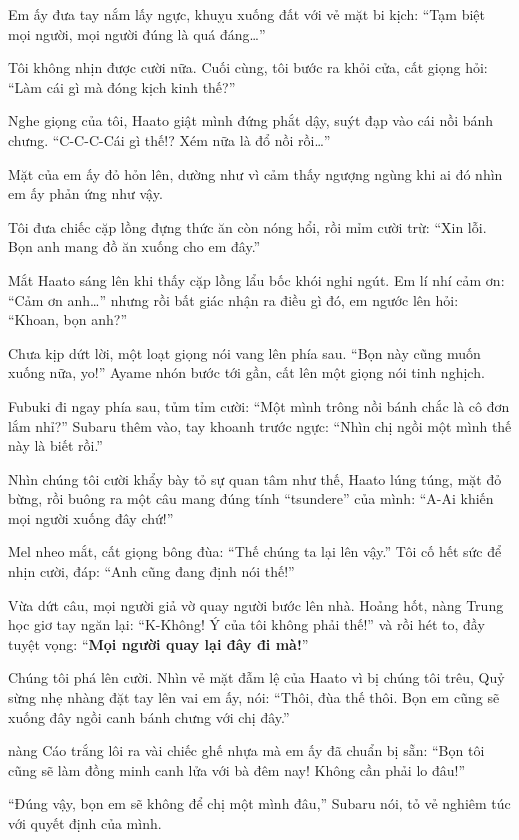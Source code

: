 \documentclass[../main.tex]{subfiles}
\begin{document}
Em ấy đưa tay nắm lấy ngực, khuỵu xuống đất với vẻ mặt bi kịch: ``Tạm biệt mọi người, mọi người đúng là quá đáng\dots''

Tôi không nhịn được cười nữa. Cuối cùng, tôi bước ra khỏi cửa, cất giọng hỏi: ``Làm cái gì mà đóng kịch kinh thế?''

Nghe giọng của tôi, Haato giật mình đứng phắt dậy, suýt đạp vào cái nồi bánh chưng. ``C-C-C-Cái gì thế!? Xém nữa là đổ nồi rồi\dots''

Mặt của em ấy đỏ hỏn lên, dường như vì cảm thấy ngượng ngùng khi ai đó nhìn em ấy phản ứng như vậy.

Tôi đưa chiếc cặp lồng đựng thức ăn còn nóng hổi, rồi mỉm cười trừ: ``Xin lỗi. Bọn anh mang đồ ăn xuống cho em đây.''

Mắt Haato sáng lên khi thấy cặp lồng lẩu bốc khói nghi ngút. Em lí nhí cảm ơn: ``Cảm ơn anh\dots'' nhưng rồi bất giác nhận ra điều gì đó, em ngước lên hỏi: ``Khoan, bọn anh?''

Chưa kịp dứt lời, một loạt giọng nói vang lên phía sau. ``Bọn này cũng muốn xuống nữa, yo!'' Ayame nhón bước tới gần, cất lên một giọng nói tinh nghịch.

Fubuki đi ngay phía sau, tủm tỉm cười: ``Một mình trông nồi bánh chắc là cô đơn lắm nhỉ?'' Subaru thêm vào, tay khoanh trước ngực: ``Nhìn chị ngồi một mình thế này là biết rồi.''

Nhìn chúng tôi cười khẩy bày tỏ sự quan tâm như thế, Haato lúng túng, mặt đỏ bừng, rồi buông ra một câu mang đúng tính ``tsundere'' của mình: ``A-Ai khiến mọi người xuống đây chứ!''

Mel nheo mắt, cất giọng bông đùa: ``Thế chúng ta lại lên vậy.'' Tôi cố hết sức để nhịn cười, đáp: ``Anh cũng đang định nói thế!''

Vừa dứt câu, mọi người giả vờ quay người bước lên nhà. Hoảng hốt, nàng Trung học giơ tay ngăn lại: ``K-Không! Ý của tôi không phải thế!'' và rồi hét to, đầy tuyệt vọng: ``\textbf{Mọi người quay lại đây đi mà!}''

Chúng tôi phá lên cười. Nhìn vẻ mặt đẫm lệ của Haato vì bị chúng tôi trêu, Quỷ sừng nhẹ nhàng đặt tay lên vai em ấy, nói: ``Thôi, đùa thế thôi. Bọn em cũng sẽ xuống đây ngồi canh bánh chưng với chị đây.''

nàng Cáo trắng lôi ra vài chiếc ghế nhựa mà em ấy đã chuẩn bị sẵn: ``Bọn tôi cũng sẽ làm đồng minh canh lửa với bà đêm nay! Không cần phải lo đâu!''

``Đúng vậy, bọn em sẽ không để chị một mình đâu,'' Subaru nói, tỏ vẻ nghiêm túc với quyết định của mình.
\end{document}
